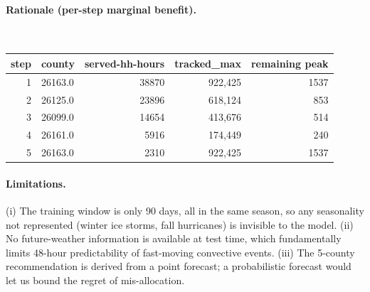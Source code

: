 \paragraph{Rationale (per-step marginal benefit).}\leavevmode\\
\vspace{-1em}
\begin{table}[H]
\centering
\begin{tabular}{rlrrr}
\toprule
step & county & served-hh-hours & tracked\_max & remaining peak \\
\midrule
  1 & 26163.0 & 38870 & 922,425 & 1537 \\
  2 & 26125.0 & 23896 & 618,124 & 853 \\
  3 & 26099.0 & 14654 & 413,676 & 514 \\
  4 & 26161.0 & 5916 & 174,449 & 240 \\
  5 & 26163.0 & 2310 & 922,425 & 1537 \\
\bottomrule
\end{tabular}
\end{table}

\paragraph{Limitations.}
(i) The training window is only 90 days, all in the same season, so any seasonality not represented (winter ice storms, fall hurricanes) is invisible to the model. (ii) No future-weather information is available at test time, which fundamentally limits 48-hour predictability of fast-moving convective events. (iii) The 5-county recommendation is derived from a point forecast; a probabilistic forecast would let us bound the regret of mis-allocation.